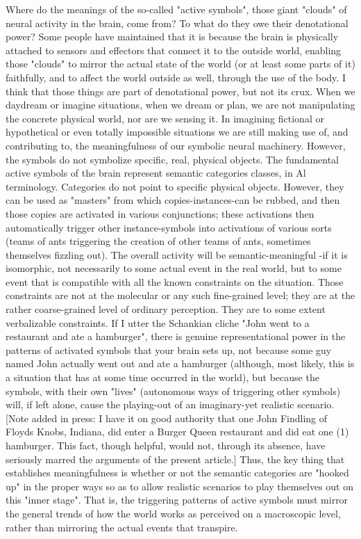         Where do the meanings of the so-called "active symbols", those giant "clouds"
of neural activity in the brain, come from? To what do they owe their denotational
power? Some people have maintained that it is because the brain is physically
attached to sensors and effectors that connect it to the outside world, enabling those
"clouds" to mirror the actual state of the world (or at least some parts of it) faithfully,
and to affect the world outside as well, through the use of the body. I think that those
things are part of denotational power, but not its crux. When we daydream or imagine
situations, when we dream or plan, we are not manipulating the concrete physical
world, nor are we sensing it. In imagining fictional or hypothetical or even totally
impossible situations we are still making use of, and contributing to, the
meaningfulness of our symbolic neural machinery. However, the symbols do not
symbolize specific, real, physical objects. The fundamental active symbols of the
brain represent semantic categories classes, in Al terminology.
        Categories do not point to specific physical objects. However, they can be
used as "masters" from which copies-instances-can be rubbed, and then those copies
are activated in various conjunctions; these activations then automatically trigger
other instance-symbols into activations of various sorts (teams of ants triggering the
creation of other teams of ants, sometimes themselves fizzling out). The overall
activity will be semantic-meaningful -if it is isomorphic, not necessarily to some
actual event in the real world, but to some event that is compatible with all the known
constraints on the situation.
        Those constraints are not at the molecular or any such fine-grained level; they
are at the rather coarse-grained level of ordinary perception. They are to some extent
verbalizable constraints. If I utter the Schankian cliche "John went to a restaurant and
ate a hamburger", there is genuine representational power in the patterns of activated
symbols that your brain sets up, not because some guy named John actually went out
and ate a hamburger (although, most likely, this is a situation that has at some time
occurred in the world), but because the symbols, with their own "lives" (autonomous
ways of triggering other symbols) will, if left alone, cause the playing-out of an
imaginary-yet realistic scenario. [Note added in press: I have it on good authority that
one John Findling of Floyds Knobs, Indiana, did enter a Burger Queen restaurant and
did eat one (1) hamburger. This fact, though helpful, would not, through its absence,
have seriously marred the arguments of the present article.]
        Thus, the key thing that establishes meaningfulness is whether or not the
semantic categories are "hooked up" in the proper ways so as to allow realistic
scenarios to play themselves out on this "inner stage". That is, the triggering patterns
of active symbols must mirror the general trends of how the world works as perceived
on a macroscopic level, rather than mirroring the actual events that transpire.




